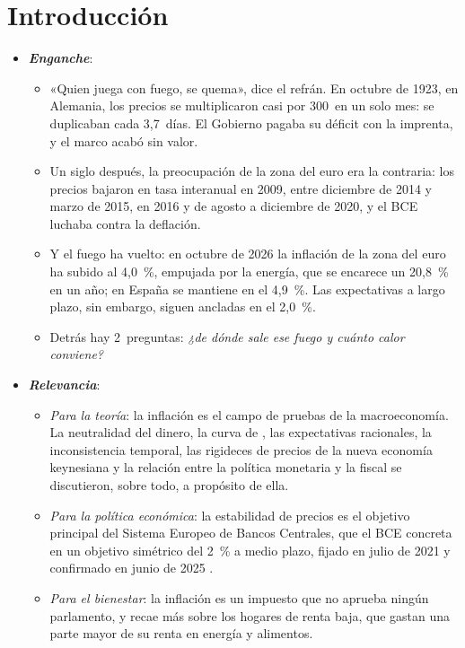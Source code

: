 \documentclass[11pt]{article}
\begin{document}
\tceetitulo

\section*{Introducción}

\begin{itemize}
\item \textbf{\emph{Enganche}}:
  \begin{itemize}
  \item «Quien juega con fuego, se quema», dice el refrán. En octubre de 1923, en Alemania, los precios se multiplicaron casi por 300~en un solo mes: se duplicaban cada 3,7~días\nocite{HankeKrus2013World}. El Gobierno pagaba su déficit con la imprenta, y el marco acabó sin valor\nocite{Sargent1982Ends}.
  \item Un siglo después, la preocupación de la zona del euro era la contraria: los precios bajaron en tasa interanual en 2009, entre diciembre de 2014 y marzo de 2015, en 2016 y de agosto a diciembre de 2020, y el BCE luchaba contra la deflación\nocite{Eurostat2026IAPC}.
  \item Y el fuego ha vuelto: en octubre de 2026 la inflación de la zona del euro ha subido al 4,0~\%, empujada por la energía, que se encarece un 20,8~\% en un año\nocite{Eurostat2026IAPCoct}; en España se mantiene en el 4,9~\%\nocite{INE2026IPCAdelantadoOct}. Las expectativas a largo plazo, sin embargo, siguen ancladas en el 2,0~\%\nocite{BCE2026SPF4T}.
  \item Detrás hay 2~preguntas: \emph{¿de dónde sale ese fuego y cuánto calor conviene?}
  \end{itemize}

\item \textbf{\emph{Relevancia}}:
  \begin{itemize}
  \item \emph{Para la teoría}: la inflación es el campo de pruebas de la macroeconomía. La neutralidad del dinero, la curva de , las expectativas racionales, la inconsistencia temporal, las rigideces de precios de la nueva economía keynesiana y la relación entre la política monetaria y la fiscal se discutieron, sobre todo, a propósito de ella.
  \item \emph{Para la política económica}: la estabilidad de precios es el objetivo principal del Sistema Europeo de Bancos Centrales\nocite{TFUE2016}, que el BCE concreta en un objetivo simétrico del 2~\% a medio plazo, fijado en julio de 2021 y confirmado en junio de 2025\nocite{BCE2021Estrategia,BCE2025Estrategia} .
  \item \emph{Para el bienestar}: la inflación es un impuesto que no aprueba ningún parlamento, y recae más sobre los hogares de renta baja, que gastan una parte mayor de su renta en energía y alimentos\nocite{BCE2022RentaBaja}.
  \end{itemize}


\end{itemize}
\end{document}
